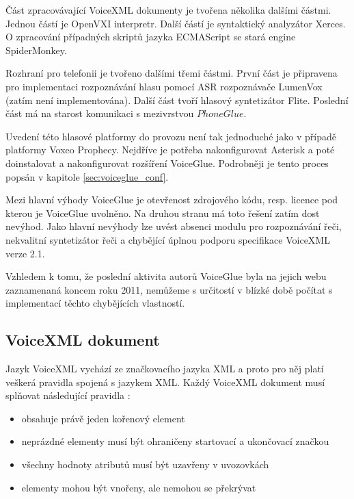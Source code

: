\documentclass[ing,male,java,dept460]{diploma}						%
\begin{document}
Část zpracovávající VoiceXML dokumenty je tvořena několika dalšími částmi. Jednou částí je OpenVXI interpretr. Další částí je syntaktický analyzátor Xerces. O zpracování případných skriptů jazyka ECMAScript se stará engine SpiderMonkey.

Rozhraní pro telefonii je tvořeno dalšími třemi částmi. První část je připravena pro implementaci rozpoznávání hlasu pomocí ASR rozpoznávače LumenVox (zatím není implementována). Další část tvoří hlasový syntetizátor Flite. Poslední část má na starost komunikaci s mezivrstvou $PhoneGlue$. \cite{vxml_interpreters}

Uvedení této hlasové platformy do provozu není tak jednoduché jako v případě platformy Voxeo Prophecy. Nejdříve je potřeba nakonfigurovat Asterisk a poté doinstalovat a nakonfigurovat rozšíření VoiceGlue. Podrobněji je tento proces popsán v kapitole \ref{sec:voiceglue_conf}.

Mezi hlavní výhody VoiceGlue je otevřenost zdrojového kódu, resp. licence pod kterou je VoiceGlue uvolněno. Na druhou stranu má toto řešení zatím dost nevýhod. Jako hlavní nevýhody lze uvést absenci modulu pro rozpoznávání řeči, nekvalitní syntetizátor řeči a chybějící úplnou podporu specifikace VoiceXML verze 2.1.

Vzhledem k tomu, že poslední aktivita autorů VoiceGlue byla na jejich webu zaznamenaná koncem roku 2011, nemůžeme s určitostí v blízké době počítat s implementací těchto chybějících vlastností.

\subsection{VoiceXML dokument}
\label{sec:Zaklady_vxml}
Jazyk VoiceXML vychází ze značkovacího jazyka XML a proto pro něj platí veškerá pravidla spojená s jazykem XML. Každý VoiceXML dokument musí splňovat následující pravidla \cite{xml_wiki}:

\begin{itemize}
\item obsahuje právě jeden kořenový element
\item neprázdné elementy musí být ohraničeny startovací a ukončovací značkou
\item všechny hodnoty atributů musí být uzavřeny v uvozovkách
\item elementy mohou být vnořeny, ale nemohou se překrývat
\end{itemize}

\end{document}
